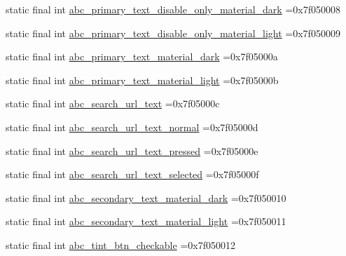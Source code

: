 \begin{DoxyCompactItemize}
\item 
static final int \mbox{\hyperlink{classcom_1_1example_1_1trainawearapplication_1_1_r_1_1color_ac992d957e6678401a5cf5176cd61008c}{abc\+\_\+primary\+\_\+text\+\_\+disable\+\_\+only\+\_\+material\+\_\+dark}} =0x7f050008
\item 
static final int \mbox{\hyperlink{classcom_1_1example_1_1trainawearapplication_1_1_r_1_1color_a6f11db51e2da60f17345fbda9be38f37}{abc\+\_\+primary\+\_\+text\+\_\+disable\+\_\+only\+\_\+material\+\_\+light}} =0x7f050009
\item 
static final int \mbox{\hyperlink{classcom_1_1example_1_1trainawearapplication_1_1_r_1_1color_a45e29b78ab40a3689159d59aabf3f0ff}{abc\+\_\+primary\+\_\+text\+\_\+material\+\_\+dark}} =0x7f05000a
\item 
static final int \mbox{\hyperlink{classcom_1_1example_1_1trainawearapplication_1_1_r_1_1color_a91f270cb621bafb275286039a82fc260}{abc\+\_\+primary\+\_\+text\+\_\+material\+\_\+light}} =0x7f05000b
\item 
static final int \mbox{\hyperlink{classcom_1_1example_1_1trainawearapplication_1_1_r_1_1color_aab36d9dd1c70842350b30842b7502c76}{abc\+\_\+search\+\_\+url\+\_\+text}} =0x7f05000c
\item 
static final int \mbox{\hyperlink{classcom_1_1example_1_1trainawearapplication_1_1_r_1_1color_af06032d36c99fcdfb0e83cb1c20edb55}{abc\+\_\+search\+\_\+url\+\_\+text\+\_\+normal}} =0x7f05000d
\item 
static final int \mbox{\hyperlink{classcom_1_1example_1_1trainawearapplication_1_1_r_1_1color_a148c37d5568d7b0ffe803d050693ddb9}{abc\+\_\+search\+\_\+url\+\_\+text\+\_\+pressed}} =0x7f05000e
\item 
static final int \mbox{\hyperlink{classcom_1_1example_1_1trainawearapplication_1_1_r_1_1color_adf83d62aa88fb9dd00e709330d7f2d03}{abc\+\_\+search\+\_\+url\+\_\+text\+\_\+selected}} =0x7f05000f
\item 
static final int \mbox{\hyperlink{classcom_1_1example_1_1trainawearapplication_1_1_r_1_1color_af42e39f0ca74264a8fb3a1b3c816b820}{abc\+\_\+secondary\+\_\+text\+\_\+material\+\_\+dark}} =0x7f050010
\item 
static final int \mbox{\hyperlink{classcom_1_1example_1_1trainawearapplication_1_1_r_1_1color_ad5db6014772dbe3b77be664ff0bef69b}{abc\+\_\+secondary\+\_\+text\+\_\+material\+\_\+light}} =0x7f050011
\item 
static final int \mbox{\hyperlink{classcom_1_1example_1_1trainawearapplication_1_1_r_1_1color_ab8b40bad62891ccf58a20b06e81cffc2}{abc\+\_\+tint\+\_\+btn\+\_\+checkable}} =0x7f050012

\end{DoxyCompactItemize}

